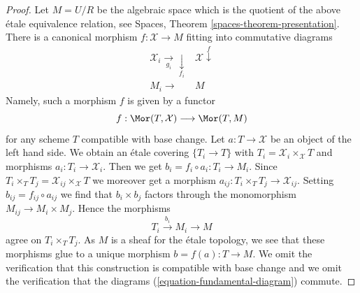 \begin{proof}
\medskip\noindent
Let $M = U/R$ be the algebraic space which is the quotient of the above
\'etale equivalence relation, see
Spaces, Theorem \ref{spaces-theorem-presentation}.
There is a canonical morphism $f : \mathcal{X} \to M$
fitting into commutative diagrams
\begin{equation}
\label{equation-fundamental-diagram}
\begin{array}{cc}\mathcal{X}_i \underset{g_i}{\longrightarrow}\underset{f_i}{\downarrow} & \mathcal{X} \overset{f}{\downarrow} \\ M_i \longrightarrow & M\end{array}
\end{equation}
Namely, such a morphism $f$ is given by a functor
$$
f : \Mor(T, \mathcal{X}) \longrightarrow \Mor(T, M)
$$
for any scheme $T$ compatible with base change. Let $a : T \to \mathcal{X}$
be an object of the left hand side. We obtain an \'etale covering
$\{T_i \to T\}$ with $T_i = \mathcal{X}_i \times_\mathcal{X} T$
and morphisms $a_i : T_i \to \mathcal{X}_i$. Then we get
$b_i = f_i \circ a_i : T_i \to M_i$. Since
$T_i \times_T T_j = \mathcal{X}_{ij} \times_\mathcal{X} T$
we moreover get a morphism $a_{ij} : T_i \times_T T_j \to \mathcal{X}_{ij}$.
Setting $b_{ij} = f_{ij} \circ a_{ij}$ we find that
$b_i \times b_j$ factors through the monomorphism
$M_{ij} \to M_i \times M_j$. Hence the morphisms
$$
T_i \xrightarrow{b_i} M_i \to M
$$
agree on $T_i \times_T T_j$. As $M$ is a sheaf for the \'etale
topology, we see that these morphisms glue to a unique
morphism $b = f(a) : T \to M$. We omit the verification that
this construction is compatible with base change and we omit
the verification that the diagrams
(\ref{equation-fundamental-diagram}) commute.


\end{proof}
